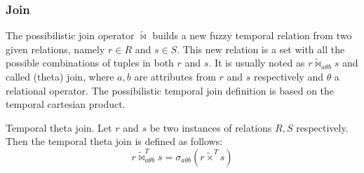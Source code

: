 \subsubsection{\label{sec:poss-join}Join}
The possibilistic join operator $\tilde \Join$ builds a new fuzzy temporal relation from two given relations, namely $r \in R$ and $s \in S$. This new relation is a set with all the possible combinations of tuples in both $r$ and $s$. It is usually noted as $r \tilde \Join_{a \theta b} s$ and called (theta) join, where $a,b$ are attributes from $r$ and $s$ respectively and $\theta$ a relational operator. The possibilistic temporal join definition is based on the temporal cartesian product.

\begin{definition}
 \label{def:poss-temporal-theta-join}
Temporal theta join. Let $r$ and $s$ be two  instances of relations $R, S$ respectively. Then the temporal theta join is defined as follows:
\begin{equation}
 \label{eq:poss-temporal-theta-join}
r \tilde \Join_{a \theta b}^{T} s= \sigma_{a \theta b} \left(r \tilde \times^{T} s \right)
\end{equation}

\end{definition}




% 

